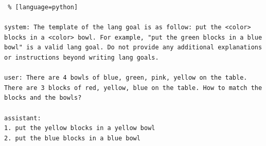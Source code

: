 
\begin{lstlisting} % [language=python] 

system: The template of the lang goal is as follow: put the <color> blocks in a <color> bowl. For example, "put the green blocks in a blue bowl" is a valid lang goal. Do not provide any additional explanations or instructions beyond writing lang goals.

user: There are 4 bowls of blue, green, pink, yellow on the table. There are 3 blocks of red, yellow, blue on the table. How to match the blocks and the bowls?

assistant: 
1. put the yellow blocks in a yellow bowl
2. put the blue blocks in a blue bowl
\end{lstlisting}

